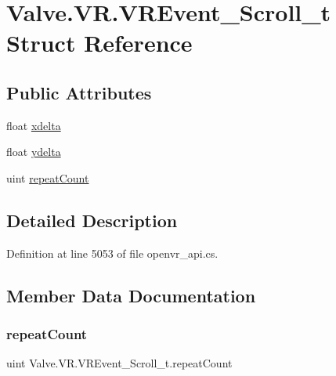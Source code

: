 \hypertarget{struct_valve_1_1_v_r_1_1_v_r_event___scroll__t}{}\section{Valve.\+V\+R.\+V\+R\+Event\+\_\+\+Scroll\+\_\+t Struct Reference}
\label{struct_valve_1_1_v_r_1_1_v_r_event___scroll__t}
\subsection*{Public Attributes}
\begin{DoxyCompactItemize}
\item 
float \mbox{\hyperlink{struct_valve_1_1_v_r_1_1_v_r_event___scroll__t_a62b204aa0bcc818636ece59f0b5306d4}{xdelta}}
\item 
float \mbox{\hyperlink{struct_valve_1_1_v_r_1_1_v_r_event___scroll__t_a5009d1ab7824c8a92b626c81d9077f77}{ydelta}}
\item 
uint \mbox{\hyperlink{struct_valve_1_1_v_r_1_1_v_r_event___scroll__t_aec9ea2e346001df3df281ea1446ba309}{repeat\+Count}}
\end{DoxyCompactItemize}


\subsection{Detailed Description}


Definition at line 5053 of file openvr\+\_\+api.\+cs.



\subsection{Member Data Documentation}
\mbox{\label{struct_valve_1_1_v_r_1_1_v_r_event___scroll__t_aec9ea2e346001df3df281ea1446ba309}} 
\subsubsection{\texorpdfstring{repeatCount}{repeatCount}}
{\footnotesize\ttfamily uint Valve.\+V\+R.\+V\+R\+Event\+\_\+\+Scroll\+\_\+t.\+repeat\+Count}



